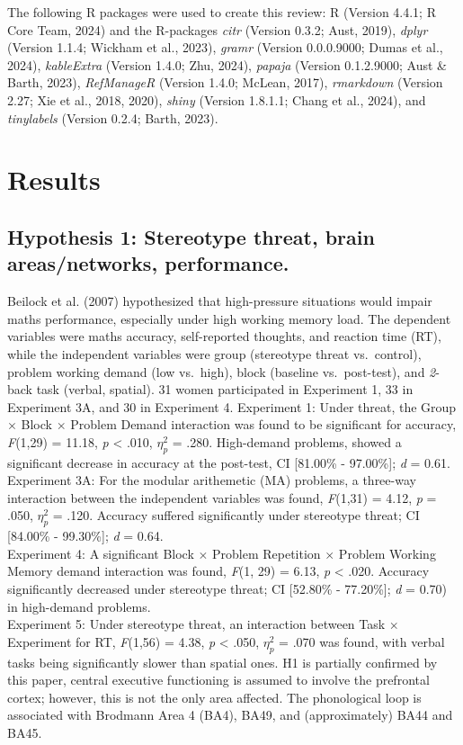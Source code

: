 \documentclass[
  stu, a4paper, 12pt,mask,floatsintext]{apa7}
\begin{document}
The following R packages were used to create this review: R (Version 4.4.1; R Core Team, 2024) and the R-packages \emph{citr} (Version 0.3.2; Aust, 2019), \emph{dplyr} (Version 1.1.4; Wickham et al., 2023), \emph{gramr} (Version 0.0.0.9000; Dumas et al., 2024), \emph{kableExtra} (Version 1.4.0; Zhu, 2024), \emph{papaja} (Version 0.1.2.9000; Aust \& Barth, 2023), \emph{RefManageR} (Version 1.4.0; McLean, 2017), \emph{rmarkdown} (Version 2.27; Xie et al., 2018, 2020), \emph{shiny} (Version 1.8.1.1; Chang et al., 2024), and \emph{tinylabels} (Version 0.2.4; Barth, 2023).

\section{Results}\label{results}

\subsection{Hypothesis 1: Stereotype threat, brain areas/networks, performance.}\label{hypothesis-1-stereotype-threat-brain-areasnetworks-performance.}

Beilock et al. (2007) hypothesized that high-pressure situations would impair maths performance, especially under high working memory load.
The dependent variables were maths accuracy, self-reported thoughts, and reaction time (RT), while the independent variables were group (stereotype threat vs.~control), problem working demand (low vs.~high), block (baseline vs.~post-test), and \emph{2}-back task (verbal, spatial).
31 women participated in Experiment 1, 33 in Experiment 3A, and 30 in Experiment 4.
Experiment 1: Under threat, the Group \(\times\) Block \(\times\) Problem Demand interaction was found to be significant for accuracy, \emph{F}(1,29) = 11.18, \emph{p} \textless{} .010, \(\eta^{2}_{p}\) = .280.
High-demand problems, showed a significant decrease in accuracy at the post-test, CI {[}81.00\% - 97.00\%{]}; \emph{d} = 0.61.\\
Experiment 3A: For the modular arithemetic (MA) problems, a three-way interaction between the independent variables was found, \emph{F}(1,31) = 4.12, \emph{p} = .050, \(\eta^{2}_{p}\) = .120.
Accuracy suffered significantly under stereotype threat; CI {[}84.00\% - 99.30\%{]}; \emph{d} = 0.64.\\
Experiment 4: A significant Block \(\times\) Problem Repetition \(\times\) Problem Working Memory demand interaction was found, \emph{F}(1, 29) = 6.13, \emph{p} \textless{} .020.
Accuracy significantly decreased under stereotype threat; CI {[}52.80\% - 77.20\%{]}; \emph{d} = 0.70) in high-demand problems.\\
Experiment 5: Under stereotype threat, an interaction between Task \(\times\) Experiment for RT, \emph{F}(1,56) = 4.38, \emph{p} \textless{} .050, \(\eta^{2}_{p}\) = .070 was found, with verbal tasks being significantly slower than spatial ones.
H1 is partially confirmed by this paper, central executive functioning is assumed to involve the prefrontal cortex; however, this is not the only area affected.
The phonological loop is associated with Brodmann Area 4 (BA4), BA49, and (approximately) BA44 and BA45.
\end{document}
